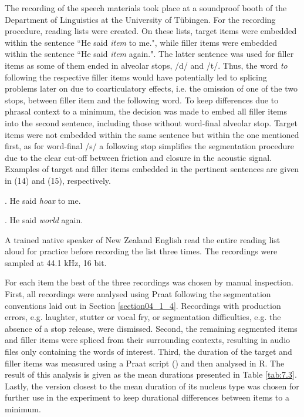 The recording of the speech materials took place at a soundproof booth of the Department of Linguistics at the University of Tübingen. For the recording procedure, reading lists were created. On these lists, target items were embedded within the sentence ``He said \textit{item} to me.", while filler items were embedded within the sentence ``He said \textit{item} again.". The latter sentence was used for filler items as some of them ended in alveolar stops, /d/ and /t/. Thus, the word \textit{to} following the respective filler items would have potentially led to splicing problems later on due to coarticulatory effects, i.e. the omission of one of the two stops, between filler item and the following word. To keep differences due to phrasal context to a minimum, the decision was made to embed all filler items into the second sentence, including those without word-final alveolar stop. Target items were not embedded within the same sentence but within the one mentioned first, as for word-final /s/ a following stop simplifies the segmentation procedure due to the clear cut-off between friction and closure in the acoustic signal. Examples of target and filler items embedded in the pertinent sentences are given in (14) and (15), respectively.

\ex.
\label{ex:14:sentence14}
He said \textit{hoax} to me.

\ex.
\label{ex:15:sentence15}
He said \textit{world} again.

A trained native speaker of New Zealand English read the entire reading list aloud for practice before recording the list three times. The recordings were sampled at 44.1 kHz, 16 bit. 

For each item the best of the three recordings was chosen by manual inspection. First, all recordings were analysed using Praat following the segmentation conventions laid out in Section \ref{section04_1_4}. Recordings with production errors, e.g. laughter, stutter or vocal fry, or segmentation difficulties, e.g. the absence of a stop release, were dismissed. Second, the remaining segmented items and filler items were spliced from their surrounding contexts, resulting in audio files only containing the words of interest. Third, the duration of the target and filler items was measured using a Praat script (\cite{deJong2008}) and then analysed in R. The result of this analysis is given as the mean durations presented in Table \ref{tab:7.3}. Lastly, the version closest to the mean duration of its nucleus type was chosen for further use in the experiment to keep durational differences between items to a minimum.

